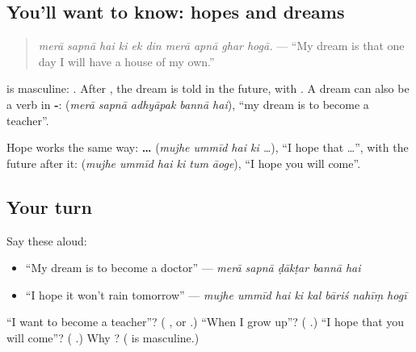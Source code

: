 \subsection*{You'll want to know: hopes and dreams}
\begin{quote}
\textbf{         }
\end{quote}

\begin{quote}
\emph{merā sapnā hai ki ek din merā apnā ghar hogā.} — \textquotedblleft{}My dream is that one day I will have a house of my own.\textquotedblright{}
\end{quote}

\textbf{} is masculine: \textbf{ }. After \textbf{}, the dream is told in the future, with \textbf{}. A dream can also be a verb in \textbf{-}: \textbf{    } (\emph{merā sapnā adhyāpak bannā hai}), \textquotedblleft{}my dream is to become a teacher\textquotedblright{}.

Hope works the same way: \textbf{    …} (\emph{mujhe ummīd hai ki …}), \textquotedblleft{}I hope that …\textquotedblright{}, with the future after it: \textbf{     } (\emph{mujhe ummīd hai ki tum āoge}), \textquotedblleft{}I hope you will come\textquotedblright{}.

\subsection*{Your turn}
Say these aloud:

\begin{itemize}
\raggedright
  \item \textquotedblleft{}My dream is to become a doctor\textquotedblright{} — \emph{merā sapnā ḍākṭar bannā hai}
  \item \textquotedblleft{}I hope it won't rain tomorrow\textquotedblright{} — \emph{mujhe ummīd hai ki kal bāriś nahīṃ hogī}
\end{itemize}

\begin{tcolorbox}[breakable,colback=teal!4,colframe=teal!35!black,title={Before you move on}]
\textquotedblleft{}I want to become a teacher\textquotedblright{}? (\textbf{    }, or \textbf{ }.) \textquotedblleft{}When I grow up\textquotedblright{}? (\textbf{ }.) \textquotedblleft{}I hope that you will come\textquotedblright{}? (\textbf{     }.) Why \textbf{ }? (\textbf{} is masculine.)
\end{tcolorbox}
